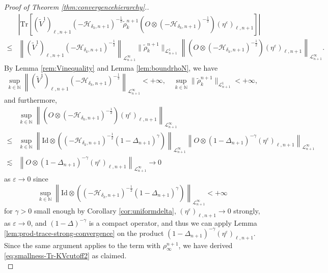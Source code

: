 \begin{proof}[Proof of Theorem \ref{thm:convergencehierarchy}.]
  \begin{align*}
    &  \left| \mathrm{Tr} \left[(\tilde{V}^1)_{\ell, n + 1} (- \mathcal{H}_{\delta_k,
    n + 1})^{- \frac{1}{2}} \tilde{\rho}^{n + 1}_k \left(O \otimes (-
    \mathcal{H}_{\delta_k, n + 1})^{- \frac{1}{2}}\right) (\eta^{\varepsilon})_{\ell,
    n + 1}\right] \right| \\
    \leq & \left\| (\tilde{V}^1)_{\ell, n + 1} (- \mathcal{H}_{\delta_k,
    n + 1})^{- \frac{1}{2}} \right\|_{\mathcal{L}^{\infty}_{n + 1}} \| \tilde{\rho}^{n
    + 1}_k \|_{\mathcal{L}^1_{n + 1}} \left\| \left(O \otimes (-
    \mathcal{H}_{\delta_k, n + 1})^{- \frac{1}{2}}\right) (\eta^{\varepsilon})_{\ell,
    n + 1} \right\|_{\mathcal{L}^{\infty}_{n + 1}} . 
  \end{align*}
  By Lemma \ref{rem:Vinequality} and Lemma \ref{lem:boundrhoN}, we have
  \[ 
   \sup_{k \in \mathbb{N}} \left\| (\tilde{V}^1)_{\ell, n + 1} (-
     \mathcal{H}_{\delta_k, n + 1})^{- \frac{1}{2}} \right\|_{\mathcal{L}^{\infty}_{n
     + 1}} < + \infty, \quad \sup_{k \in \mathbb{N}} \| \tilde{\rho}^{n + 1}_k
     \|_{\mathcal{L}^1_{n + 1}} < + \infty,
     \]
  and furthermore, 
  \begin{align*}
    &  \sup_{k \in \mathbb{N}} \left\| \left(O \otimes (-
    \mathcal{H}_{\delta_k, n + 1})^{- \frac{1}{2}}\right) (\eta^{\varepsilon})_{\ell,
    n + 1} \right\|_{\mathcal{L}^{\infty}_{n + 1}} \\
    \leqslant & \sup_{k \in \mathbb{N}} \left\| \mathrm{Id} \otimes\left( (-
    \mathcal{H}_{\delta_k, n + 1})^{- \frac{1}{2}} (1 - \Delta_{n+1})^{\gamma}\right)
    \right\|_{\mathcal{L}^{\infty}_{n + 1}} \left\| O \otimes (1 - \Delta_{n+1})^{- \gamma}
    (\eta^{\varepsilon})_{\ell, n + 1} \right\|_{\mathcal{L}^{\infty}_{n + 1}}
     \\
    \lesssim & \left\| O \otimes (1 - \Delta_{n+1})^{- \gamma} (\eta^{\varepsilon})_{\ell, n +
    1} \right\|_{\mathcal{L}^{\infty}_{n + 1}} \rightarrow 0 \nonumber
  \end{align*}
  as $\varepsilon \rightarrow 0$ since 
  \[
  \sup_{k \in \mathbb{N}} \left\| \mathrm{Id}
  \otimes \left((- \mathcal{H}_{\delta_k, n + 1})^{- \frac{1}{2}} (1 -
  \Delta_{n+1})^{\gamma}\right) \right\|_{\mathcal{L}^{\infty}_{n + 1}} < + \infty
  \]
  for $\gamma
  > 0$ small enough by Corollary \ref{cor:uniformdelta},
  $(\eta^{\varepsilon})_{\ell, n + 1} \rightarrow 0$ strongly, as $\varepsilon
  \rightarrow 0$, and $(1 - \Delta)^{- \gamma}$ is a compact operator, and
  thus we can apply Lemma \ref{lem:prod-trace-strong-convergence} on the
  product $(1 - \Delta_{n+1})^{- \gamma} (\eta^{\varepsilon})_{\ell, n + 1}$. Since
  the same argument applies to the term with $\rho^{n + 1}_{\infty}$, we have
  derived \eqref{eq:smallness-Tr-KVcutoff2} as claimed.\\


\end{proof}
